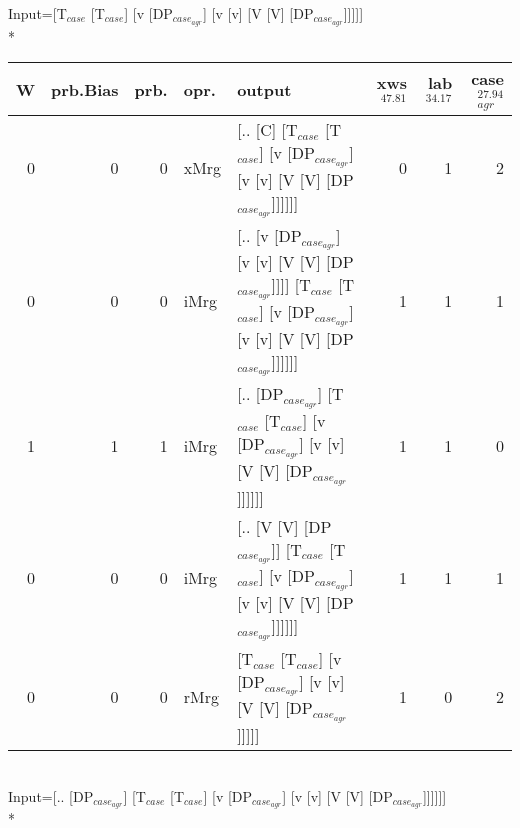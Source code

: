 \begingroup\scriptsize Input=[T$_{case}$ [T$_{case}$] [v [DP$_{case_{agr}}$] [v [v] [V [V] [DP$_{case_{agr}}$]]]]]\\*
\begin{tabularx}{\linewidth}{rrrlXrrr}
\hline
   W &   prb.Bias &   prb. & opr.   & output                                                                                                                 &   xws$^{47.81}$ &   lab$^{34.17}$ &   case$_{agr}^{27.94}$ \\
\hline
   0 &       0 &   0 & xMrg & [.. [C] [T$_{case}$ [T$_{case}$] [v [DP$_{case_{agr}}$] [v [v] [V [V] [DP$_{case_{agr}}$]]]]]]                                             &             0 &             1 &                  2 \\
   0 &       0 &   0 & iMrg & [.. [v [DP$_{case_{agr}}$] [v [v] [V [V] [DP$_{case_{agr}}$]]]] [T$_{case}$ [T$_{case}$] [v [DP$_{case_{agr}}$] [v [v] [V [V] [DP$_{case_{agr}}$]]]]]] &             1 &             1 &                  1 \\
   1 &       1 &   1 & iMrg & [.. [DP$_{case_{agr}}$] [T$_{case}$ [T$_{case}$] [v [DP$_{case_{agr}}$] [v [v] [V [V] [DP$_{case_{agr}}$]]]]]]                                   &             1 &             1 &                  0 \\
   0 &       0 &   0 & iMrg & [.. [V [V] [DP$_{case_{agr}}$]] [T$_{case}$ [T$_{case}$] [v [DP$_{case_{agr}}$] [v [v] [V [V] [DP$_{case_{agr}}$]]]]]]                           &             1 &             1 &                  1 \\
   0 &       0 &   0 & rMrg & [T$_{case}$ [T$_{case}$] [v [DP$_{case_{agr}}$] [v [v] [V [V] [DP$_{case_{agr}}$]]]]]                                                      &             1 &             0 &                  2 \\
\hline
\end{tabularx}\endgroup\\
\begingroup\scriptsize Input=[.. [DP$_{case_{agr}}$] [T$_{case}$ [T$_{case}$] [v [DP$_{case_{agr}}$] [v [v] [V [V] [DP$_{case_{agr}}$]]]]]]\\*
